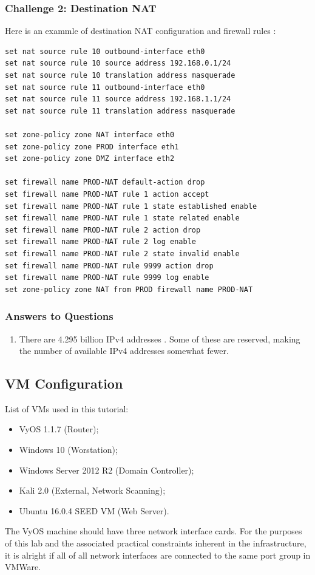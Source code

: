 \documentclass[12pt]{article}
\begin{document}
\subsubsection*{Challenge 2: Destination NAT}
Here is an exammle of destination NAT configuration and firewall rules \cite{vyoswiki}:
\begin{lstlisting}
set nat source rule 10 outbound-interface eth0
set nat source rule 10 source address 192.168.0.1/24
set nat source rule 10 translation address masquerade
set nat source rule 11 outbound-interface eth0
set nat source rule 11 source address 192.168.1.1/24
set nat source rule 11 translation address masquerade

set zone-policy zone NAT interface eth0
set zone-policy zone PROD interface eth1
set zone-policy zone DMZ interface eth2

set firewall name PROD-NAT default-action drop
set firewall name PROD-NAT rule 1 action accept
set firewall name PROD-NAT rule 1 state established enable
set firewall name PROD-NAT rule 1 state related enable
set firewall name PROD-NAT rule 2 action drop
set firewall name PROD-NAT rule 2 log enable
set firewall name PROD-NAT rule 2 state invalid enable
set firewall name PROD-NAT rule 9999 action drop
set firewall name PROD-NAT rule 9999 log enable
set zone-policy zone NAT from PROD firewall name PROD-NAT
\end{lstlisting}

\subsubsection*{Answers to Questions}
\begin{enumerate}
\item There are 4.295 billion IPv4 addresses \cite{arsipv4}. Some of these are reserved, making the number of available IPv4 addresses somewhat fewer.
\end{enumerate}

\subsection*{VM Configuration}
List of VMs used in this tutorial:
\begin{itemize}
\item VyOS 1.1.7 (Router);
\item Windows 10 (Worstation);
\item Windows Server 2012 R2 (Domain Controller);
\item Kali 2.0 (External, Network Scanning);
\item Ubuntu 16.0.4 SEED VM (Web Server).
\end{itemize}
The VyOS machine should have three network interface cards. For the purposes of this lab and the associated practical constraints inherent in the infrastructure, it is alright if all of all network interfaces are connected to the same port group in VMWare. 
\end{document}
